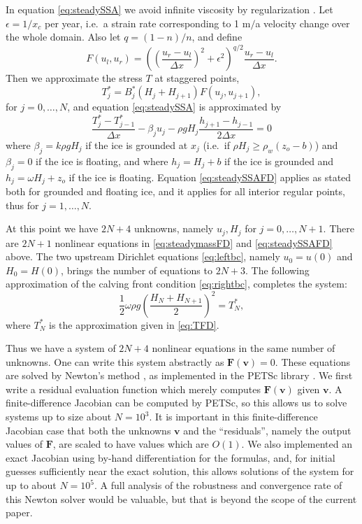 \documentclass[review,letterpaper]{igs}
\newcommand{\eps}{\epsilon}
\begin{document}
In equation \eqref{eq:steadySSA} we avoid infinite viscosity by regularization \citep{SchoofStream}.  Let $\eps=1/x_c$ per year, i.e.~a strain rate corresponding to 1 m$/$a velocity change over the whole domain.  Also let $q = (1-n)/n$, and define
\begin{equation}
F(u_l,u_r) = \left(\left(\frac{u_r-u_l}{\Delta x}\right)^2 + \eps^2\right)^{q/2} \frac{u_r-u_l}{\Delta x}. \label{eq:viscregFD}
\end{equation}
Then we approximate the stress $T$ at staggered points,
\begin{equation}
T_j^* = B_j^* \left(H_j + H_{j+1}\right) F(u_j,u_{j+1}), \label{eq:TFD}
\end{equation}
for $j=0,\dots,N$, and equation \eqref{eq:steadySSA} is approximated by
\begin{equation}
\frac{T_j^* - T_{j-1}^*}{\Delta x} - \beta_j u_j - \rho g H_j \frac{h_{j+1} - h_{j-1}}{2 \Delta x} = 0 \label{eq:steadySSAFD}
\end{equation}
where $\beta_j = k \rho g H_j$ if the ice is grounded at $x_j$ (i.e.~if $\rho H_j \ge \rho_w (z_o - b)$) and $\beta_j=0$ if the ice is floating, and where $h_j = H_j + b$ if the ice is grounded and $h_j = \omega H_j + z_o$ if the ice is floating.  Equation \eqref{eq:steadySSAFD} applies as stated both for grounded and floating ice, and it applies for all interior regular points, thus for $j=1,\dots,N$.

At this point we have $2N+4$ unknowns, namely $u_j,H_j$ for $j=0,\dots,N+1$.  There are $2N+1$ nonlinear equations in \eqref{eq:steadymassFD} and \eqref{eq:steadySSAFD} above.  The two upstream Dirichlet equations \eqref{eq:leftbc}, namely $u_0=u(0)$ and $H_0=H(0)$, brings the number of equations to $2N+3$.  The following approximation of the calving front condition \eqref{eq:rightbc}, completes the system:
\begin{equation}
\frac{1}{2} \omega \rho g \left(\frac{H_N + H_{N+1}}{2}\right)^2 = T_N^*, \label{eq:rightbcFD}
\end{equation}
where $T_N^*$ is the approximation given in \eqref{eq:TFD}.

Thus we have a system of $2N+4$ nonlinear equations in the same number of unknowns.  One can write this system abstractly as $\mathbf{F}(\mathbf{v})=0$.  These equations are solved by Newton's method \citep{Kelley}, as implemented in the PETSc library \citep{petsc-user-ref}.  We first write a residual evaluation function which merely computes $\mathbf{F}(\mathbf{v})$ given $\mathbf{v}$.  A finite-difference Jacobian can be computed by PETSc, so this allows us to solve systems up to size about $N=10^3$.  It is important in this finite-difference Jacobian case that both the unknowns $\mathbf{v}$ and the ``residuals'', namely the output values of $\mathbf{F}$, are scaled to have values which are $O(1)$.  We also implemented an exact Jacobian using by-hand differentiation for the formulas, and, for initial guesses sufficiently near the exact solution, this allows solutions of the system for up to about $N=10^5$.  A full analysis of the robustness and convergence rate of this Newton solver would be valuable, but that is beyond the scope of the current paper.
\end{document}
